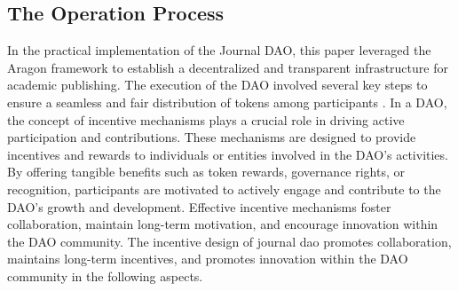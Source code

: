 \documentclass[lettersize,journal]{IEEEtran}
\begin{document}
\subsection{The Operation Process}

In the practical implementation of the Journal DAO, this paper leveraged the Aragon framework to establish a decentralized and transparent infrastructure for academic publishing. The execution of the DAO involved several key steps to ensure a seamless and fair distribution of tokens among participants \cite{el2020overview}.
In a DAO, the concept of incentive mechanisms plays a crucial role in driving active participation and contributions. These mechanisms are designed to provide incentives and rewards to individuals or entities involved in the DAO's activities. By offering tangible benefits such as token rewards, governance rights, or recognition, participants are motivated to actively engage and contribute to the DAO's growth and development. Effective incentive mechanisms foster collaboration, maintain long-term motivation, and encourage innovation within the DAO community. The incentive design of journal dao promotes collaboration, maintains long-term incentives, and promotes innovation within the DAO community in the following aspects.
\end{document}
